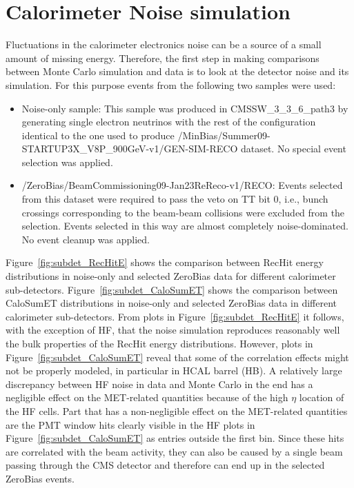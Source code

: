 \section{Calorimeter Noise simulation}
\label{sc:CaloNoise}

Fluctuations in the calorimeter electronics noise can be a source of a small amount of missing energy. Therefore, the first step
in making comparisons between Monte Carlo simulation and data is to look at the detector noise and its simulation. For this purpose
events from the following two samples were used:

\begin{itemize}
  \item Noise-only sample: \newline
This sample was produced in CMSSW\_3\_3\_6\_path3 by generating single electron neutrinos with the rest of the configuration identical to the one used to
produce /MinBias/Summer09-STARTUP3X\_V8P\_900GeV-v1/GEN-SIM-RECO dataset. No special event selection was applied.

  \item /ZeroBias/BeamCommissioning09-Jan23ReReco-v1/RECO: \newline
Events selected from this dataset were required to pass the veto on TT bit 0, i.e., bunch crossings corresponding to the beam-beam
collisions were excluded from the selection. Events selected in this way are almost completely noise-dominated. No event cleanup was applied.
\end{itemize}

Figure~\ref{fig:subdet_RecHitE} shows the comparison between RecHit energy distributions in noise-only and selected ZeroBias data for different
calorimeter sub-detectors. Figure~\ref{fig:subdet_CaloSumET} shows the comparison between CaloSumET distributions in noise-only and selected 
ZeroBias data in different calorimeter sub-detectors. From plots in Figure~\ref{fig:subdet_RecHitE} it follows, with the exception of HF, that
the noise simulation reproduces reasonably well the bulk properties of the RecHit energy distributions. However, plots in 
Figure~\ref{fig:subdet_CaloSumET} reveal that some of the correlation effects might not be properly modeled, in particular in HCAL barrel (HB).
A relatively large discrepancy between HF noise in data and Monte Carlo in the end has a negligible effect on the MET-related quantities 
because of the high $\eta$ location of the HF cells. Part that has a non-negligible effect on the MET-related quantities are the PMT window hits
clearly visible in the HF plots in Figure~\ref{fig:subdet_CaloSumET} as entries outside the first bin. Since these
 hits are correlated with the beam activity, they can also be caused by a single beam passing through the CMS detector and therefore can end up
in the selected ZeroBias events.

